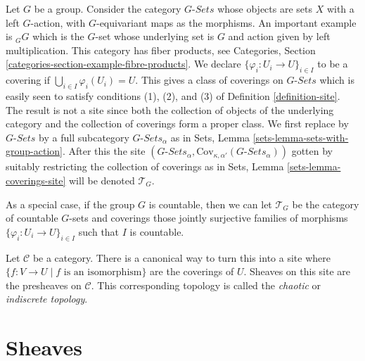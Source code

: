 \begin{example}
\label{example-site-on-group}
Let $G$ be a group. Consider the category $G\textit{-Sets}$
whose objects are sets $X$ with a left $G$-action, with
$G$-equivariant maps as the morphisms. An important example
is ${}_GG$ which is the $G$-set whose underlying set is $G$ and
action given by left multiplication. This category has
fiber products, see Categories, Section
\ref{categories-section-example-fibre-products}.
We declare $\{\varphi_i : U_i \to U\}_{i\in I}$ to be
a covering if $\bigcup_{i\in I} \varphi_i(U_i) = U$.
This gives a class of coverings on $G\textit{-Sets}$
which is easily seen to satisfy conditions (1), (2), and (3)
of Definition \ref{definition-site}. The result is not a
site since both the collection of objects of the underlying category and
the collection of coverings form a proper class.
We first replace by $G\textit{-Sets}$ by a
full subcategory $G\textit{-Sets}_\alpha$ as in Sets,
Lemma \ref{sets-lemma-sets-with-group-action}.
After this the site
$(G\textit{-Sets}_\alpha,
\text{Cov}_{\kappa, \alpha'}(G\textit{-Sets}_\alpha))$
gotten by suitably restricting the collection of coverings
as in Sets, Lemma \ref{sets-lemma-coverings-site} will be
denoted $\mathcal{T}_G$.

\medskip\noindent
As a special case, if the group $G$ is countable, then we can let
$\mathcal{T}_G$ be the category of countable $G$-sets and coverings
those jointly surjective families of morphisms
$\{\varphi_i : U_i \to U\}_{i \in I}$ such that $I$ is countable.
\end{example}

\begin{example}
\label{example-indiscrete}
Let $\mathcal{C}$ be a category. There is a canonical way to turn this
into a site where $\{f : V \to U \mid f\text{ is an isomorphism}\}$
are the coverings of $U$.
Sheaves on this site are the presheaves on $\mathcal{C}$.
This corresponding topology is called the {\it chaotic} or
{\it indiscrete topology}.
\end{example}















\section{Sheaves}
\label{section-sheaves}

